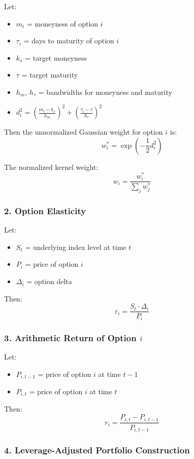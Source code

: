 \documentclass[11pt]{article}
\begin{document}
Let:
\begin{itemize}
  \item $m_{i}$ = moneyness of option $i$
  \item $\tau_{i}$ = days to maturity of option $i$
  \item $k_{s}$ = target moneyness
  \item $\tau$ = target maturity
  \item $h_{m}$, $h_{\tau}$ = bandwidths for moneyness and maturity
  \item $d_{i}^2 = \left( \frac{m_{i} - k_{s}}{h_{m}} \right)^2 + \left( \frac{\tau_{i} - \tau}{h_{\tau}} \right)^2$
\end{itemize}

Then the unnormalized Gaussian weight for option $i$ is:
\[
w_{i}^* = \exp\left( -\frac{1}{2} d_{i}^2 \right)
\]

The normalized kernel weight:
\[
w_{i} = \frac{w_{i}^*}{\sum_j w_j^*}
\]

\subsubsection{2. Option Elasticity}

Let:
\begin{itemize}
  \item $S_{t}$ = underlying index level at time $t$
  \item $P_{i}$ = price of option $i$
  \item $\Delta_{i}$ = option delta
\end{itemize}

Then:
\[
\varepsilon_{i} = \frac{S_t \cdot \Delta_{i}}{P_{i}}
\]

\subsubsection{3. Arithmetic Return of Option $i$}

Let:
\begin{itemize}
  \item $P_{i,t-1}$ = price of option $i$ at time $t-1$
  \item $P_{i,t}$ = price of option $i$ at time $t$
\end{itemize}

Then:
\[
r_{i} = \frac{P_{i,t} - P_{i,t-1}}{P_{i,t-1}}
\]

\subsubsection{4. Leverage-Adjusted Portfolio Construction}
\end{document}
